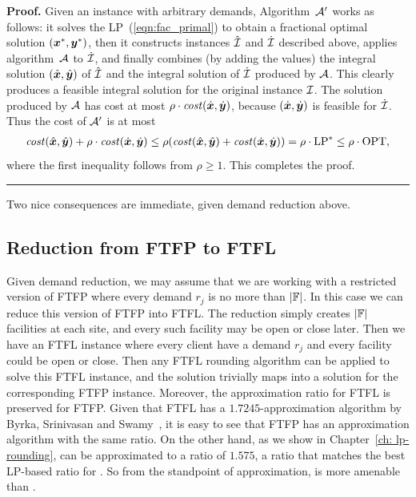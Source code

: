\documentclass[oneside,final]{ucr}
\newenvironment{proof}[1][Proof]{\textbf{#1.} }{\ \rule{0.5em}{0.5em}}
\begin{document}

\begin{proof}
  Given an {\FTFP} instance with arbitrary demands, Algorithm~$\calA'$ works
as follows: it solves the LP~(\ref{eqn:fac_primal}) to obtain a
  fractional optimal solution $(\boldsymbol{x}^\ast,\boldsymbol{y}^\ast)$, then it constructs
  instances $\hatcalI$ and $\dotcalI$ described above,  applies
  algorithm~$\calA$ to $\dotcalI$, and finally combines (by adding
  the values) the integral solution $(\hat{\boldsymbol{x}}, \hat{\boldsymbol{y}})$ of
  $\hatcalI$ and the integral solution of $\dotcalI$ produced
  by $\calA$. This clearly produces a feasible integral
  solution for the original instance $\mathcal{I}$.
The solution produced by $\calA$ has cost at most
$\rho\cdot{\it cost}(\dot{\boldsymbol{x}},\dot{\boldsymbol{y}})$, because $(\dot{\boldsymbol{x}},\dot{\boldsymbol{y}})$
is feasible for $\dotcalI$. Thus the cost of $\calA'$ is at most
% 
 \begin{align*}
 {\it cost}(\hat{\boldsymbol{x}}, \hat{\boldsymbol{y}}) + \rho\cdot{\it cost}(\dot{\boldsymbol{x}},\dot{\boldsymbol{y}})
	\le
 \rho({\it cost}(\hat{\boldsymbol{x}}, \hat{\boldsymbol{y}}) + {\it cost}(\dot{\boldsymbol{x}},\dot{\boldsymbol{y}}))
		= \rho\cdot\mbox{\rm LP}^\ast \le \rho\cdot\mbox{\rm OPT},
  \end{align*}
%
where the first inequality follows from $\rho\geq 1$. This completes
the proof.
\end{proof}

Two nice consequences are immediate, given demand reduction
above.

\subsection{Reduction from FTFP to FTFL}
Given demand reduction, we may assume that we are working
with a restricted version of FTFP where every demand $r_j$
is no more than $|\mathbb{F}|$. In this case we can reduce
this version of FTFP into FTFL. The reduction simply creates
$|\mathbb{F}|$ facilities at each site, and every such
facility may be open or close later. Then we have an FTFL
instance where every client have a demand $r_j$ and every
facility could be open or close. Then any FTFL rounding
algorithm can be applied to solve this FTFL instance, and
the solution trivially maps into a solution for the
corresponding FTFP instance. Moreover, the approximation
ratio for FTFL is preserved for FTFP. Given that FTFL has a
$1.7245$-approximation algorithm by Byrka, Srinivasan and
Swamy~\cite{ByrkaSS10}, it is easy to see that FTFP has an
approximation algorithm with the same ratio. On the other
hand, as we show in Chapter~\ref{ch: lp-rounding}, {\FTFP}
can be approximated to a ratio of $1.575$, a ratio that
matches the best LP-based ratio for {\UFL}. So from the
standpoint of approximation, {\FTFP} is more amenable than
{\FTFL}.
\end{document}
